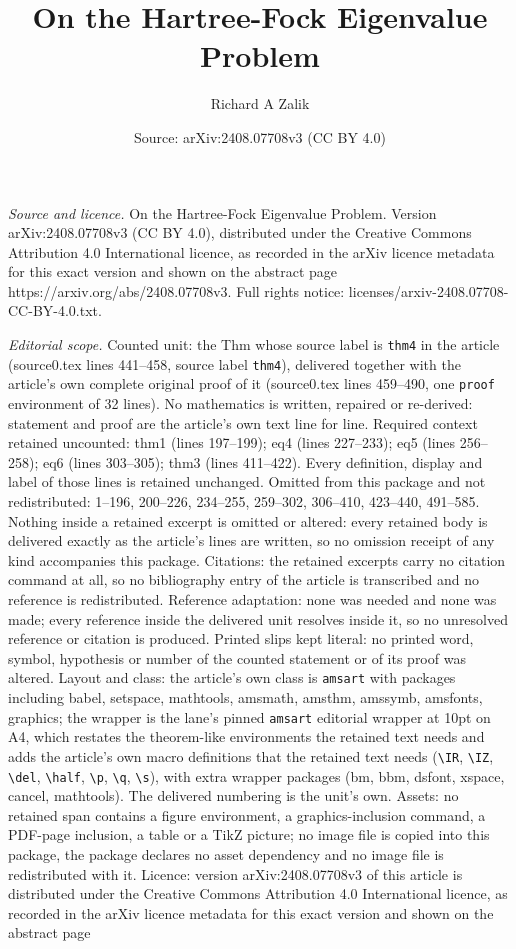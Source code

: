 \documentclass[10pt,a4paper]{amsart}
\title[On the Hartree-Fock Eigenvalue Problem]{On the Hartree-Fock Eigenvalue Problem}
\author{Richard A Zalik}
\date{Source: arXiv:2408.07708v3 (CC BY 4.0)}
\begin{document}
\maketitle

\noindent\emph{Source and licence.} On the Hartree-Fock Eigenvalue Problem. Version arXiv:2408.07708v3 (CC BY 4.0), distributed under the Creative Commons Attribution 4.0 International licence, as recorded in the arXiv licence metadata for this exact version and shown on the abstract page https://arxiv.org/abs/2408.07708v3. Full rights notice: licenses/arxiv-2408.07708-CC-BY-4.0.txt.\par\smallskip

\noindent\textit{Editorial scope.} Counted unit: the Thm whose source label is \texttt{thm4} in the article (source0.tex lines 441--458, source label \texttt{thm4}), delivered together with the article's own complete original proof of it (source0.tex lines 459--490, one \texttt{proof} environment of 32 lines). No mathematics is written, repaired or re-derived: statement and proof are the article's own text line for line. Required context retained uncounted: thm1 (lines 197--199); eq4 (lines 227--233); eq5 (lines 256--258); eq6 (lines 303--305); thm3 (lines 411--422). Every definition, display and label of those lines is retained unchanged. Omitted from this package and not redistributed: 1--196, 200--226, 234--255, 259--302, 306--410, 423--440, 491--585. Nothing inside a retained excerpt is omitted or altered: every retained body is delivered exactly as the article's lines are written, so no omission receipt of any kind accompanies this package. Citations: the retained excerpts carry no citation command at all, so no bibliography entry of the article is transcribed and no reference is redistributed. Reference adaptation: none was needed and none was made; every reference inside the delivered unit resolves inside it, so no unresolved reference or citation is produced. Printed slips kept literal: no printed word, symbol, hypothesis or number of the counted statement or of its proof was altered. Layout and class: the article's own class is \texttt{amsart} with packages including babel, setspace, mathtools, amsmath, amsthm, amssymb, amsfonts, graphics; the wrapper is the lane's pinned \texttt{amsart} editorial wrapper at 10pt on A4, which restates the theorem-like environments the retained text needs and adds the article's own macro definitions that the retained text needs (\texttt{\textbackslash IR}, \texttt{\textbackslash IZ}, \texttt{\textbackslash del}, \texttt{\textbackslash half}, \texttt{\textbackslash p}, \texttt{\textbackslash q}, \texttt{\textbackslash s}), with extra wrapper packages (bm, bbm, dsfont, xspace, cancel, mathtools). The delivered numbering is the unit's own. Assets: no retained span contains a figure environment, a graphics-inclusion command, a PDF-page inclusion, a table or a TikZ picture; no image file is copied into this package, the package declares no asset dependency and no image file is redistributed with it. Licence: version arXiv:2408.07708v3 of this article is distributed under the Creative Commons Attribution 4.0 International licence, as recorded in the arXiv licence metadata for this exact version and shown on the abstract page 
\end{document}
